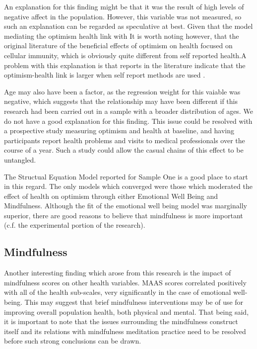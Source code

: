 \documentclass{article}
\begin{document}
An explanation for this finding might be that it was the result
of high levels of negative affect in the population.  However, this
variable was not measured, so such an explanation can be regarded
as speculative at best. Given that the model mediating the optimism health link with   It is worth noting however, that the original
literature of the beneficial effects of optimism on health focused
on cellular immunity, which is obviously quite different from self
reported health.A problem with this explanation is that reports in the
literature indicate that the optimism-health link is larger when self
report methods are used \cite{rasmussen2009optimism}.  

Age may also have been a factor, as the regression weight for this vaiable was negative, which suggests that the relationship may have been different
if this research had been carried out in a sample with a broader distribution of ages.  We do not have a good explanation for this finding.
This issue could be resolved with a prospective study
measuring optimism and health at baseline, and having participants
report health problems and visits to medical professionals over the
course of a year.  Such a study could allow the casual chains of this
effect to be untangled.

The Structual Equation Model reported for Sample One is a good place to start in this regard.
The only models which converged were those which moderated the effect of health on optimism 
through either Emotional Well Being and Mindfulness. Although the fit of the emotional well being 
model was marginally superior, there are good reasons to believe that mindfulness is more 
important (c.f. the experimental portion of the research). 


\subsection{Mindfulness}
\label{sec:mindfulness}

Another interesting finding which arose from this research is the
impact of mindfulness scores on other health variables.  MAAS scores
correlated positively with all of the health sub-scales, very significantly
in the case of emotional well-being.  This may suggest that brief mindfulness
interventions may be of use for improving overall population health,
both physical and mental.  That being said, it is important to note  that the issues surrounding the mindfulness construct
itself and its relations with mindfulness meditation practice need
to be resolved before such strong conclusions can be drawn.
\end{document}
